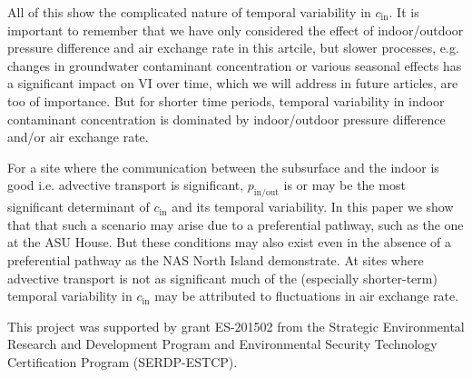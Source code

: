 \documentclass[journal=esthag,manuscript=article]{achemso}
\begin{document}
All of this show the complicated nature of temporal variability in $c_\mathrm{in}$.
It is important to remember that we have only considered the effect of indoor/outdoor pressure difference and air exchange rate in this artcile, but slower processes, e.g. changes in groundwater contaminant concentration or various seasonal effects has a significant impact on VI over time, which we will address in future articles, are too of importance.
But for shorter time periods, temporal variability in indoor contaminant concentration is dominated by indoor/outdoor pressure difference and/or air exchange rate.\par

For a site where the communication between the subsurface and the indoor is good i.e. advective transport is significant, $p_\mathrm{in/out}$ is or may be the most significant determinant of $c_\mathrm{in}$ and its temporal variability.
In this paper we show that that such a scenario may arise due to a preferential pathway, such as the one at the ASU House.
But these conditions may also exist even in the absence of a preferential pathway as the NAS North Island demonstrate.
At sites where advective transport is not as significant much of the (especially shorter-term) temporal variability in $c_\mathrm{in}$ may be attributed to fluctuations in air exchange rate.\par

\begin{acknowledgement}
 This project was supported by grant ES-201502 from the Strategic Environmental Research and Development Program and Environmental Security Technology Certification Program (SERDP-ESTCP).
\end{acknowledgement}
\end{document}
